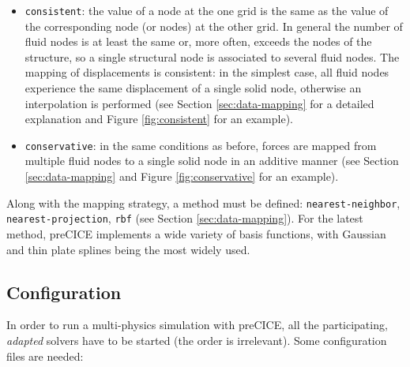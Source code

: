 \begin{itemize}
	\item \texttt{consistent}: the value of a node at the one grid is the same as the value of the corresponding node (or nodes) at the other grid. In general the number of fluid nodes is at least the same or, more often, exceeds the nodes of the structure, so a single structural node is associated to several fluid nodes. The mapping of displacements is consistent: in the simplest case, all fluid nodes experience the same displacement of a single solid node, otherwise an interpolation is performed (see Section \ref{sec:data-mapping} for a detailed explanation and Figure \ref{fig:consistent} for an example).
	\item \texttt{conservative}: in the same conditions as before, forces are mapped from multiple fluid nodes to a single solid node in an additive manner (see Section \ref{sec:data-mapping} and Figure \ref{fig:conservative} for an example).
\end{itemize} 

Along with the mapping strategy, a method must be defined: \texttt{nearest-neighbor}, \texttt{nearest-projection}, \texttt{rbf} (see Section \ref{sec:data-mapping}). For the latest method, preCICE implements a wide variety of basis functions, with Gaussian and thin plate splines being the most widely used.

 

\subsection{Configuration}
\label{sec:pc-config}

In order to run a multi-physics simulation with preCICE, all the participating, \textit{adapted} solvers have to be started (the order is irrelevant).
Some configuration files are needed:

